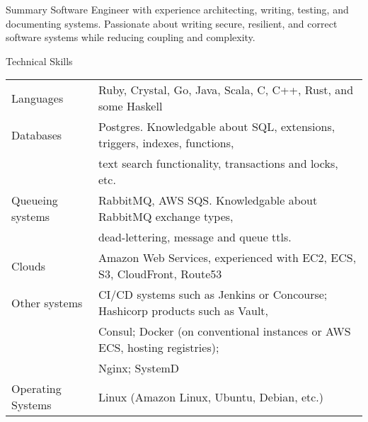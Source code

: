 \documentclass{resume} %
\begin{document}
\begin{rSection}{Summary}
	Software Engineer with experience architecting, writing, testing, and documenting systems.
	Passionate about writing secure, resilient, and correct software systems while reducing coupling and complexity.
\end{rSection}

\begin{rSection}{Technical Skills}
	\begin{table}[h]
		\centering
		\begin{tabular}{ l l }
			Languages & Ruby, Crystal, Go, Java, Scala, C, C++, Rust, and some Haskell \\
			Databases & Postgres. Knowledgable about SQL, extensions, triggers, indexes, functions, \\
			& text search functionality, transactions and locks, etc. \\
			Queueing systems & RabbitMQ, AWS SQS. Knowledgable about RabbitMQ exchange types, \\
			& dead-lettering, message and queue ttls. \\
			Clouds & Amazon Web Services, experienced with EC2, ECS, S3, CloudFront, Route53 \\
			Other systems & CI/CD systems such as Jenkins or Concourse; Hashicorp products such as Vault, \\
			& Consul; Docker (on conventional instances or AWS ECS, hosting registries); \\
			& Nginx; SystemD \\
			Operating Systems & Linux (Amazon Linux, Ubuntu, Debian, etc.) \\
		\end{tabular}
	\end{table}
\end{rSection}
\end{document}
